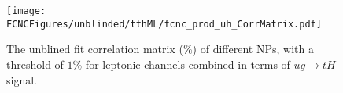 \begin{figure}[H]
\centering
\texttt{[image: \\FCNCFigures/unblinded/tthML/fcnc\_prod\_uh\_CorrMatrix.pdf]}
\caption{ The unblined fit correlation matrix ($\%$) of different NPs, with a threshold of $1\%$ for leptonic channels combined in terms of $ug\to tH$ signal.}
\label{fig:fcnc_prod_uh_CorrMatrix_2}
\end{figure}











\newpage
